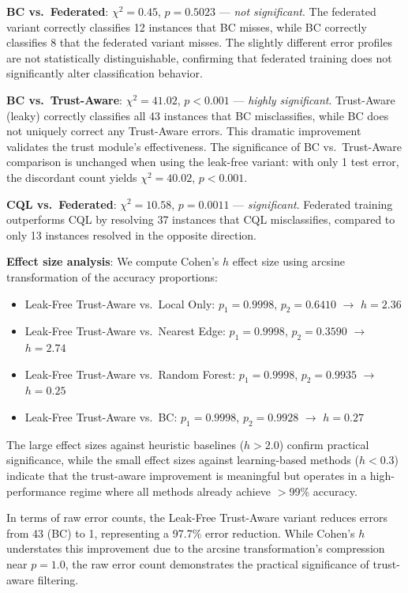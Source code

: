 \documentclass[10pt,letterpaper]{article}
\begin{document}
\textbf{BC vs.\ Federated}: $\chi^2 = 0.45$, $p = 0.5023$ --- \emph{not significant}. The federated variant correctly classifies 12 instances that BC misses, while BC correctly classifies 8 that the federated variant misses. The slightly different error profiles are not statistically distinguishable, confirming that federated training does not significantly alter classification behavior.

\textbf{BC vs.\ Trust-Aware}: $\chi^2 = 41.02$, $p < 0.001$ --- \emph{highly significant}. Trust-Aware (leaky) correctly classifies all 43 instances that BC misclassifies, while BC does not uniquely correct any Trust-Aware errors. This dramatic improvement validates the trust module's effectiveness. The significance of BC vs.\ Trust-Aware comparison is unchanged when using the leak-free variant: with only 1 test error, the discordant count yields $\chi^2 = 40.02$, $p < 0.001$.

\textbf{CQL vs.\ Federated}: $\chi^2 = 10.58$, $p = 0.0011$ --- \emph{significant}. Federated training outperforms CQL by resolving 37 instances that CQL misclassifies, compared to only 13 instances resolved in the opposite direction.

\textbf{Effect size analysis}: We compute Cohen's $h$ effect size using arcsine transformation of the accuracy proportions:
\begin{itemize}
    \item Leak-Free Trust-Aware vs.\ Local Only: $p_1=0.9998$, $p_2=0.6410$ $\rightarrow$ $h=2.36$
    \item Leak-Free Trust-Aware vs.\ Nearest Edge: $p_1=0.9998$, $p_2=0.3590$ $\rightarrow$ $h=2.74$
    \item Leak-Free Trust-Aware vs.\ Random Forest: $p_1=0.9998$, $p_2=0.9935$ $\rightarrow$ $h=0.25$
    \item Leak-Free Trust-Aware vs.\ BC: $p_1=0.9998$, $p_2=0.9928$ $\rightarrow$ $h=0.27$
\end{itemize}
The large effect sizes against heuristic baselines ($h > 2.0$) confirm practical significance, while the small effect sizes against learning-based methods ($h < 0.3$) indicate that the trust-aware improvement is meaningful but operates in a high-performance regime where all methods already achieve $>$99\% accuracy.

In terms of raw error counts, the Leak-Free Trust-Aware variant reduces errors from 43 (BC) to 1, representing a 97.7\% error reduction. While Cohen's $h$ understates this improvement due to the arcsine transformation's compression near $p=1.0$, the raw error count demonstrates the practical significance of trust-aware filtering.
\end{document}
